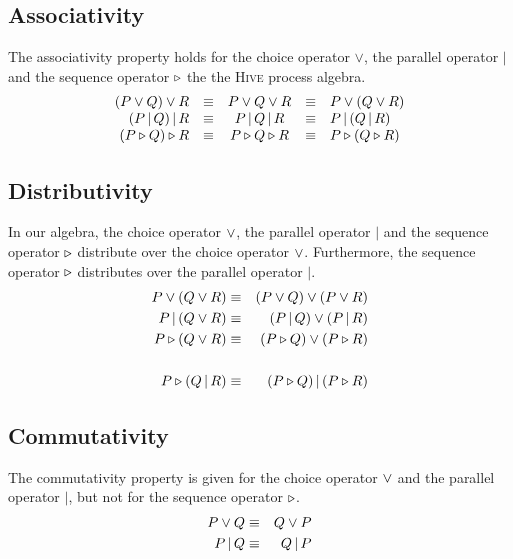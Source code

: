 \subsection{Associativity}
The associativity property holds for the choice operator $\vee$, the parallel operator $|$ and the sequence operator $\triangleright$ the the \textsc{Hive} process algebra.
\begin{equation*}
\begin{array}{rcccl}
  \left( P \vee Q \right) \vee R & \equiv & P \vee Q \vee R & \equiv & P \vee \left( Q \vee R \right) \\
  \left( P \,|\, Q \right) |\, R & \equiv & P \,|\, Q \,|\, R & \equiv & P \,| \left( Q \,|\, R \right) \\
  \left( P \triangleright Q \right) \triangleright R & \equiv & P \triangleright Q \triangleright R & \equiv & P \triangleright \left( Q \triangleright R \right)
\end{array}
\end{equation*}

\subsection{Distributivity}
In our algebra, the choice operator $\vee$, the parallel operator $|$ and the sequence operator $\triangleright$ distribute over the choice operator $\vee$. Furthermore, the sequence operator $\triangleright$ distributes over the parallel operator $|$.
\begin{eqnarray*}
  P \vee \left( Q \vee R \right) & \equiv & \left( P \vee Q \right) \vee \left( P \vee R \right) \\
  P \,| \left( Q \vee R \right) & \equiv & \left( P \,|\, Q \right) \vee \left( P \,|\, R \right) \\
  P \triangleright \left( Q \vee R \right) & \equiv & \left( P \triangleright Q \right) \vee \left( P \triangleright R \right) \\
  & & \\
  P \triangleright \left( Q \,|\, R \right) & \equiv & \left( P \triangleright Q \right) | \left( P \triangleright R \right)
\end{eqnarray*}

\subsection{Commutativity}
The commutativity property is given for the choice operator $\vee$ and the parallel operator $|$, but not for the sequence operator $\triangleright$.
\begin{eqnarray*}
  P \vee Q & \equiv & Q \vee P \\
  P \,|\, Q & \equiv & Q \,|\, P
\end{eqnarray*}

